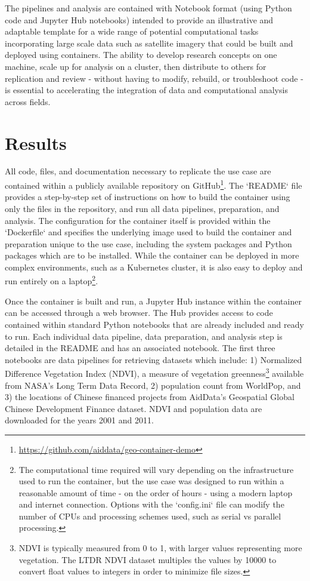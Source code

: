 \documentclass[a4paper]{article}
\begin{document}
The pipelines and analysis are contained with Notebook format (using Python code and Jupyter Hub notebooks) intended to provide an illustrative and adaptable template for a wide range of potential computational tasks incorporating large scale data such as satellite imagery that could be built and deployed using containers. The ability to develop research concepts on one machine, scale up for analysis on a cluster, then distribute to others for replication and review - without having to modify, rebuild, or troubleshoot code - is essential to accelerating the integration of data and computational analysis across fields.


\section{Results}

All code, files, and documentation necessary to replicate the use case are contained within a publicly available repository on GitHub\footnote{\url{https://github.com/aiddata/geo-container-demo}}. The `README` file provides a step-by-step set of instructions on how to build the container using only the files in the repository, and run all data pipelines, preparation, and analysis. The configuration for the container itself is provided within the `Dockerfile` and specifies the underlying image used to build the container and preparation unique to the use case, including the system packages and Python packages which are to be installed. While the container can be deployed in more complex environments, such as a Kubernetes cluster, it is also easy to deploy and run entirely on a laptop\footnote{The computational time required will vary depending on the infrastructure used to run the container, but the use case was designed to run within a reasonable amount of time - on the order of hours - using a modern laptop and internet connection. Options with the `config.ini` file can modify the number of CPUs and processing schemes used, such as serial vs parallel processing.}.

Once the container is built and run, a Jupyter Hub instance within the container can be accessed through a web browser. The Hub provides access to code contained within standard Python notebooks that are already included and ready to run. Each individual data pipeline, data preparation, and analysis step is detailed in the README and has an associated notebook. The first three notebooks are data pipelines for retrieving datasets which include: 1) Normalized Difference Vegetation Index (NDVI), a measure of vegetation greenness\footnote{NDVI is typically measured from 0 to 1, with larger values representing more vegetation. The LTDR NDVI dataset multiples the values by 10000 to convert float values to integers in order to minimize file sizes.} available from NASA's Long Term Data Record\citep{NASA2023}, 2) population count from WorldPop\citep{WorldPop2018}, and 3) the locations of Chinese financed projects from AidData's Geospatial Global Chinese Development Finance dataset\citep{Goodman2024}. NDVI and population data are downloaded for the years 2001 and 2011.
\end{document}
